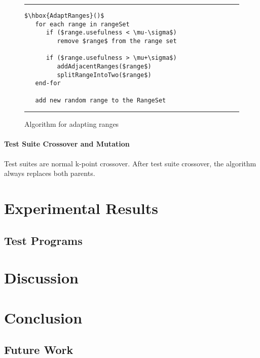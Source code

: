 \documentclass[runningheads]{llncs}
\begin{document}
\begin{figure}[h!]
\begin{center}
\hrule
\medskip
\begin{Verbatim}[fontfamily=tt, xleftmargin=10pt, commandchars=\\\{\},
   codes={\catcode`$=3\catcode`^=7\catcode`_=8}]
$\hbox{AdaptRanges}()$    
   for each range in rangeSet
      if ($range.usefulness < \mu-\sigma$)
         remove $range$ from the range set
      
      if ($range.usefulness > \mu+\sigma$)
         addAdjacentRanges($range$)
         splitRangeIntoTwo($range$)  
   end-for
   
   add new random range to the RangeSet
\end{Verbatim}
\hrule
\end{center}
\caption{Algorithm for adapting ranges \label{fig:adptRang}}
\end{figure}

\paragraph{Test Suite Crossover and Mutation} 
Test suites are normal k-point crossover. After test suite crossover, the algorithm always replaces both parents. 



\FloatBarrier
\newpage
\section{Experimental Results}
\subsection{Test Programs}



\newpage
\section{Discussion}

\newpage
\section{Conclusion}

\subsection{Future Work}
\end{document}
